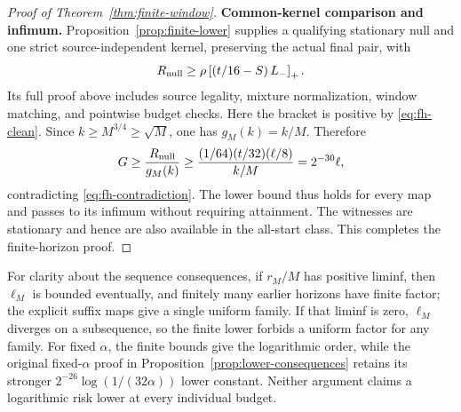 \begin{proof}[Proof of Theorem~\ref{thm:finite-window}]
\noindent\textbf{Common-kernel comparison and infimum.}
Proposition~\ref{prop:finite-lower} supplies a qualifying stationary null
and one strict source-independent kernel, preserving the actual final pair,
with
\[
 R_{\rm null}\ge\rho\left[\left(t/16-S\right)L_-\right]_+.
\]
Its full proof above includes source legality, mixture normalization,
window matching, and pointwise budget checks. Here the bracket is positive
by \eqref{eq:fh-clean}. Since $k\ge M^{3/4}\ge\sqrt M$, one has
$g_M(k)=k/M$. Therefore
\[
 G\ge\frac{R_{\rm null}}{g_M(k)}
 \ge\frac{(1/64)(t/32)(\ell/8)}{k/M}
 =2^{-30}\ell,
\]
contradicting \eqref{eq:fh-contradiction}. The lower bound thus holds for
every map and passes to its infimum without requiring attainment.
The witnesses are stationary and hence are also available in the all-start
class. This completes the finite-horizon proof.
\end{proof}

For clarity about the sequence consequences, if $r_M/M$ has positive
liminf, then $\ell_M$ is bounded eventually, and finitely many earlier
horizons have finite factor; the explicit suffix maps give a single
uniform family. If that liminf is zero, $\ell_M$ diverges on a subsequence,
so the finite lower forbids a uniform factor for any family. For fixed
$\alpha$, the finite bounds give the logarithmic order, while the original
fixed-$\alpha$ proof in Proposition~\ref{prop:lower-consequences} retains
its stronger $2^{-26}\log(1/(32\alpha))$ lower constant. Neither argument
claims a logarithmic risk lower at every individual budget.
